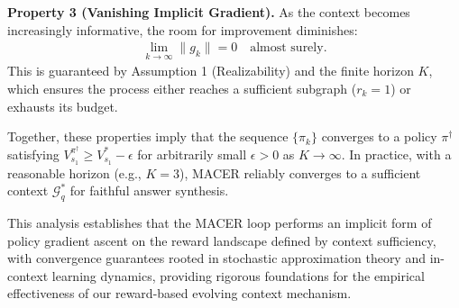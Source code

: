 \textbf{Property 3 (Vanishing Implicit Gradient).}
As the context becomes increasingly informative, the room for improvement diminishes:
\begin{align}
    \lim_{k \to \infty} \|g_k\| = 0 \quad \text{almost surely}.
\end{align}
This is guaranteed by Assumption 1 (Realizability) and the finite horizon $K$, which ensures the process either reaches a sufficient subgraph ($r_k = 1$) or exhausts its budget.

Together, these properties imply that the sequence $\{\pi_k\}$ converges to a policy $\pi^\dagger$ satisfying $V^{\pi^\dagger}_{s_1} \geq V^*_{s_1} - \epsilon$ for arbitrarily small $\epsilon > 0$ as $K \to \infty$. In practice, with a reasonable horizon (e.g., $K=3$), MACER reliably converges to a sufficient context $\mathcal{G}^*_q$ for faithful answer synthesis.

This analysis establishes that the MACER loop performs an implicit form of policy gradient ascent on the reward landscape defined by context sufficiency, with convergence guarantees rooted in stochastic approximation theory and in-context learning dynamics, providing rigorous foundations for the empirical effectiveness of our reward-based evolving context mechanism.
